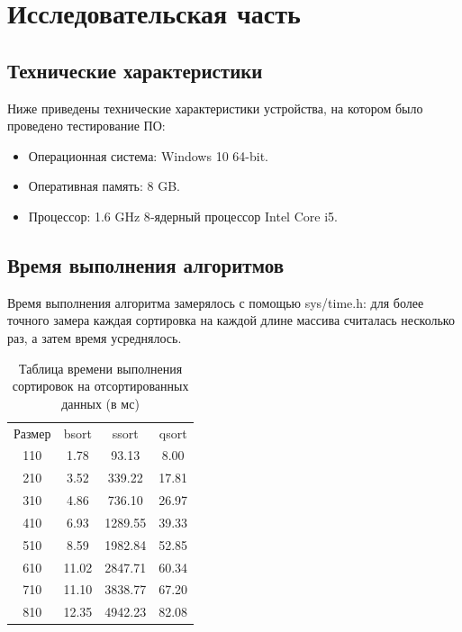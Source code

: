 \documentclass{report}
\begin{document}
\chapter{Исследовательская часть}

\section{Технические характеристики}

Ниже приведены технические характеристики устройства, на котором было проведено тестирование ПО:

\begin{itemize}
	\item Операционная система: Windows 10 64-bit.
	\item Оперативная память: 8 GB.
	\item Процессор: 1.6 GHz 8‑ядерный процессор Intel Core i5.

\end{itemize}

\section{Время выполнения алгоритмов}
Время выполнения алгоритма замерялось с помощью sys/time.h: для более точного замера каждая сортировка на каждой длине массива считалась несколько раз, а затем время усреднялось. 

\begin{table} [h!]
	\caption{Таблица времени выполнения сортировок на отсортированных данных (в мс)}
	\begin{center}
	\begin{tabular}{|c c c c|}

		\hline

		Размер & bsort & ssort & qsort  \\ [0.5ex]

110 & 1.78 & 93.13 & 8.00  \\ 
\hline
210 & 3.52 & 339.22 & 17.81  \\ 
\hline
310 & 4.86 & 736.10 & 26.97  \\ 
\hline
410 & 6.93 & 1289.55 & 39.33  \\ 
\hline
510 & 8.59 & 1982.84 & 52.85  \\ 
\hline
610 & 11.02 & 2847.71 & 60.34  \\ 
\hline
710 & 11.10 & 3838.77 & 67.20  \\ 
\hline
810 & 12.35 & 4942.23 & 82.08  \\ 

	\hline 
	\end{tabular}
	\end{center}
\end{table}
\end{document}
